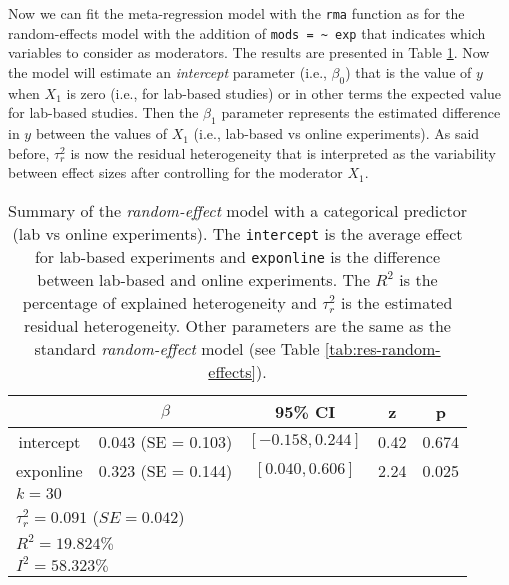\documentclass[
  man,floatsintext]{apa6}
\begin{document}
\normalsize

Now we can fit the meta-regression model with the \texttt{rma} function as for the random-effects model with the addition of \texttt{mods\ =\ \textasciitilde{}\ exp} that indicates which variables to consider as moderators. The results are presented in Table \ref{tab:res-meta-reg-dummy}. Now the model will estimate an \emph{intercept} parameter (i.e., \(\beta_0\)) that is the value of \(y\) when \(X_1\) is zero (i.e., for lab-based studies) or in other terms the expected value for lab-based studies. Then the \(\beta_1\) parameter represents the estimated difference in \(y\) between the values of \(X_1\) (i.e., lab-based vs online experiments). As said before, \(\tau^2_r\) is now the residual heterogeneity that is interpreted as the variability between effect sizes after controlling for the moderator \(X_1\).

\scriptsize

\begin{table}[H]

\caption{\label{tab:res-meta-reg-dummy}Summary of the \emph{random-effect} model with a categorical predictor (lab vs online experiments). The \texttt{intercept} is the average effect for lab-based experiments and \texttt{exponline} is the difference between lab-based and online experiments. The \(R^2\) is the percentage of explained heterogeneity and \(\tau^2_r\) is the estimated residual heterogeneity. Other parameters are the same as the standard \emph{random-effect} model (see Table \ref{tab:res-random-effects}).}
\centering
\fontsize{9}{11}\selectfont
\begin{tabular}[t]{ccccc}
\toprule
 & $\beta$ & 95\% CI & z & p\\
\midrule
intercept & 0.043 (SE = 0.103) & $[-0.158, 0.244]$ & 0.42 & 0.674\\
exponline & 0.323 (SE = 0.144) & $[0.040, 0.606]$ & 2.24 & 0.025\\
\bottomrule
\multicolumn{5}{l}{\textsuperscript{} $k = 30$}\\
\multicolumn{5}{l}{\textsuperscript{} $\tau^2_r = 0.091$ ($SE = 0.042$)}\\
\multicolumn{5}{l}{\textsuperscript{} $R^2 = 19.824\%$}\\
\multicolumn{5}{l}{\textsuperscript{} $I^2 = 58.323\%$}\\
\end{tabular}
\end{table}

\normalsize
\end{document}
